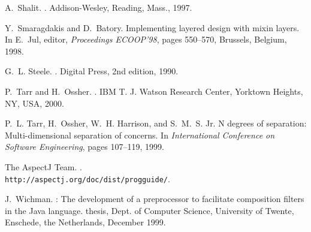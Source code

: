 \documentclass{acm_proc_article-sp}
\begin{document}
\begin{thebibliography}{10}
A.~Shalit.
.
\newblock Addison-Wesley, Reading, Mass., 1997.

\balancecolumns

Y.~Smaragdakis and D.~Batory.
\newblock Implementing layered design with mixin layers.
\newblock In E.~Jul, editor, {\em Proceedings {ECOOP}'98}, pages 550--570,
  Brussels, Belgium, 1998.

G.~L. Steele.
.
\newblock Digital Press, 2nd edition, 1990.

P.~Tarr and H.~Ossher.
.
\newblock IBM T. J. Watson Research Center, Yorktown Heights, NY, USA, 2000.

P.~L. Tarr, H.~Ossher, W.~H. Harrison, and S.~M.~S. Jr.
\newblock N degrees of separation: Multi-dimensional separation of concerns.
\newblock In {\em International Conference on Software Engineering}, pages
  107--119, 1999.

{The AspectJ Team}.
.
\newblock \texttt{\\ http://aspectj.org/doc/dist/progguide/}.

J.~Wichman.
: The development of a preprocessor to facilitate
  composition filters in the {Java} language.
 thesis, Dept. of Computer Science, University of Twente,
  Enschede, the Netherlands, December 1999.

\end{thebibliography}
\end{document}

